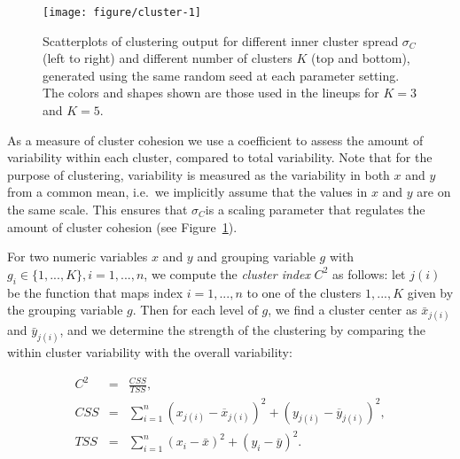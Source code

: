 \documentclass[12pt]{article}\usepackage[]{graphicx}\usepackage[]{color}
\newenvironment{knitrout}{}{} %
\begin{document}
\begin{figure}[bht]
\begin{knitrout}
\color{fgcolor}

{\centering \texttt{[image: figure/cluster-1]} 

}



\end{knitrout}
\caption[Parameters affecting $M_C$]{\label{fig:clusters} Scatterplots of clustering output for different inner cluster spread $\sigma_C$  (left to right) and different number of clusters $K$ (top and bottom), generated using the same random seed at each parameter setting. The colors and shapes shown are those used in the lineups for $K=3$ and $K=5$.}
\end{figure}
As a measure of cluster cohesion we use a coefficient to assess the amount of variability within each cluster, compared to total variability. Note that for the purpose of clustering, variability is measured as the variability in both $x$ and $y$ from a common mean, i.e.\ we implicitly assume that the values in $x$ and $y$ are on the same scale. This ensures that $\sigma_C$is a scaling parameter that regulates the amount of cluster cohesion (see Figure~\ref{fig:clusters}).  %



For two numeric variables $x$ and $y$ and grouping variable $g$ with $g_i \in \{1, ..., K\}, i = 1, ..., n$, we compute the  {\it cluster index} $C^2$ as follows: let $j(i)$ be the function that maps index $i = 1, ..., n$ to one of the clusters $1, ..., K$ given by the grouping variable $g$. Then for each  level of $g$, we find  a cluster center as $\bar{x}_{j(i)}$ and  $\bar{y}_{j(i)}$, and we determine the strength of the clustering by comparing the within cluster variability with the overall variability: 

\begin{eqnarray}\label{eq:clusterMeasure}
C^2 &=& \frac{CSS}{TSS},\\
\nonumber CSS &=& \sum_{i=1}^n \left(x_{j(i)} - \overline{x}_{j(i)}\right)^2 + \left(y_{j(i)} - \overline{y}_{j(i)} \right)^2, \\
\nonumber TSS &=& \sum_{i=1}^n \left(x_i - \bar{x}\right)^2 + \left(y_i - \bar{y}\right)^2.
\end{eqnarray}
\end{document}
